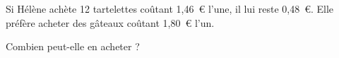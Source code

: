 Si Hélène achète 12 tartelettes coûtant 1,46~\textgreek{\euro} l'une,
il lui reste 0,48~\textgreek{\euro}. Elle préfère acheter des gâteaux
coûtant 1,80~\textgreek{\euro} l'un.
\par Combien peut-elle en acheter ?